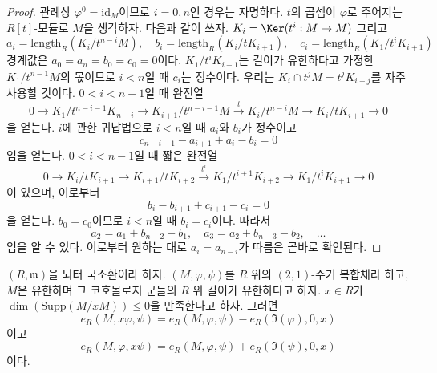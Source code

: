 \begin{proof}
관례상 $\varphi^0 = \text{id}_M$이므로 $i = 0, n$인 경우는 자명하다.
$t$의 곱셈이 $\varphi$로 주어지는 $R[t]$-모듈로 $M$을 생각하자.
다음과 같이 쓰자.
$K_i = \Ker(t^i : M \to M)$ 그리고
$$
a_i = \text{length}_R(K_i/t^{n - i}M),\quad
b_i = \text{length}_R(K_i/tK_{i + 1}),\quad
c_i = \text{length}_R(K_1/t^iK_{i + 1})
$$
경계값은 $a_0 = a_n = b_0 = c_0 = 0$이다. $K_1/t^iK_{i + 1}$는
길이가 유한하다고 가정한 $K_1/t^{n - 1}M$의 몫이므로 $i < n$일 때
$c_i$는 정수이다. 우리는 $K_i \cap t^jM = t^jK_{i + j}$를 자주
사용할 것이다. $0 < i < n - 1$일 때 완전열
$$
0 \to
K_1/t^{n - i - 1}K_{n - i} \to
K_{i + 1}/t^{n - i - 1}M \xrightarrow{t} K_i/t^{n - i}M
\to K_i/tK_{i + 1} \to 0
$$
을 얻는다. $i$에 관한 귀납법으로 $i < n$일 때 $a_i$와 $b_i$가
정수이고
$$
c_{n - i - 1} - a_{i + 1} + a_i - b_i = 0
$$
임을 얻는다. $0 < i < n - 1$일 때 짧은 완전열
$$
0 \to
K_i/tK_{i + 1} \to
K_{i + 1}/tK_{i + 2} \xrightarrow{t^i}
K_1/t^{i + 1}K_{i + 2} \to
K_1/t^iK_{i + 1} \to 0
$$
이 있으며, 이로부터
$$
b_i - b_{i + 1} + c_{i + 1} - c_i = 0
$$
을 얻는다. $b_0 = c_0$이므로 $i < n$일 때 $b_i = c_i$이다.
따라서
$$
a_2 = a_1 + b_{n - 2} - b_1,\quad
a_3 = a_2 + b_{n - 3} - b_2,\quad \ldots
$$
임을 알 수 있다. 이로부터 원하는 대로 $a_i = a_{n - i}$가 따름은
곧바로 확인된다.
\end{proof}
\begin{lemma}
\label{lemma-multiply-period-length}
$(R, \mathfrak m)$을 뇌터 국소환이라 하자. $(M, \varphi, \psi)$를
$R$ 위의 $(2, 1)$-주기 복합체라 하고, $M$은 유한하며 그 코호몰로지
군들의 $R$ 위 길이가 유한하다고 하자. $x \in R$가
$\dim(\text{Supp}(M/xM)) \leq 0$을 만족한다고 하자. 그러면
$$
e_R(M, x\varphi, \psi) = e_R(M, \varphi, \psi) - e_R(\Im(\varphi), 0, x)
$$
이고
$$
e_R(M, \varphi, x\psi) = e_R(M, \varphi, \psi) + e_R(\Im(\psi), 0, x)
$$
이다.
\end{lemma}

